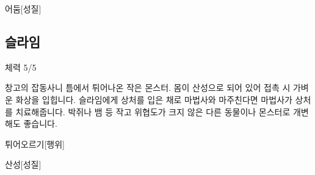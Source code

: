 \documentclass{report}
\begin{document}
		\begin{story}{어둠}{[성질]}
		\end{story}
	
	\subsection*{슬라임}
		체력 5/5
		
		창고의 잡동사니 틈에서 튀어나온 작은 몬스터. 몸이 산성으로 되어 있어 접촉 시 가벼운 화상을 입힙니다. 슬라임에게 상처를 입은 채로 마법사와 마주친다면 마법사가 상처를 치료해줍니다. 박쥐나 뱀 등 작고 위협도가 크지 않은 다른 동물이나 몬스터로 개변해도 좋습니다.
		
		\begin{story}{튀어오르기}{[행위]}
		\end{story}
		
		\begin{story}{산성}{[성질]}
		\end{story}
	
\end{document}
